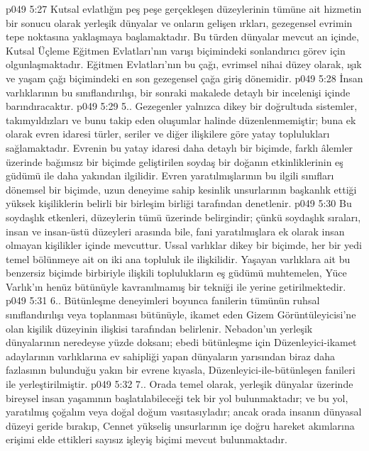 \vs p049 5:27 Kutsal evlatlığın peş peşe gerçekleşen düzeylerinin tümüne ait hizmetin bir sonucu olarak yerleşik dünyalar ve onların gelişen ırkları, gezegensel evrimin tepe noktasına yaklaşmaya başlamaktadır. Bu türden dünyalar mevcut an içinde, Kutsal Üçleme Eğitmen Evlatları’nın varışı biçimindeki sonlandırıcı görev için olgunlaşmaktadır. Eğitmen Evlatları’nın bu çağı, evrimsel nihai düzey olarak, ışık ve yaşam çağı biçimindeki en son gezegensel çağa giriş dönemidir.
\vs p049 5:28 İnsan varlıklarının bu sınıflandırılışı, bir sonraki makalede detaylı bir incelenişi içinde barındıracaktır.
\vs p049 5:29 5.\bibnobreakspace {}. Gezegenler yalnızca dikey bir doğrultuda sistemler, takımyıldızları ve bunu takip eden oluşumlar halinde düzenlenmemiştir; buna ek olarak evren idaresi türler, seriler ve diğer ilişkilere göre yatay toplulukları sağlamaktadır. Evrenin bu yatay idaresi daha detaylı bir biçimde, farklı âlemler üzerinde bağımsız bir biçimde geliştirilen soydaş bir doğanın etkinliklerinin eş güdümü ile daha yakından ilgilidir. Evren yaratılmışlarının bu ilgili sınıfları dönemsel bir biçimde, uzun deneyime sahip kesinlik unsurlarının başkanlık ettiği yüksek kişiliklerin belirli bir birleşim birliği tarafından denetlenir.
\vs p049 5:30 Bu soydaşlık etkenleri, düzeylerin tümü üzerinde belirgindir; çünkü soydaşlık sıraları, insan ve insan\hyp{}üstü düzeyleri arasında bile, fani yaratılmışlara ek olarak insan olmayan kişilikler içinde mevcuttur. Ussal varlıklar dikey bir biçimde, her bir yedi temel bölünmeye ait on iki ana topluluk ile ilişkilidir. Yaşayan varlıklara ait bu benzersiz biçimde birbiriyle ilişkili toplulukların eş güdümü muhtemelen, Yüce Varlık’ın henüz bütünüyle kavranılmamış bir tekniği ile yerine getirilmektedir.
\vs p049 5:31 6.\bibnobreakspace {}. Bütünleşme deneyimleri boyunca fanilerin tümünün ruhsal sınıflandırılışı veya toplanması bütünüyle, ikamet eden Gizem Görüntüleyicisi’ne olan kişilik düzeyinin ilişkisi tarafından belirlenir. Nebadon’un yerleşik dünyalarının neredeyse yüzde doksanı; ebedi bütünleşme için Düzenleyici\hyp{}ikamet adaylarının varlıklarına ev sahipliği yapan dünyaların yarısından biraz daha fazlasının bulunduğu yakın bir evrene kıyasla, Düzenleyici\hyp{}ile\hyp{}bütünleşen fanileri ile yerleştirilmiştir.
\vs p049 5:32 7.\bibnobreakspace {}. Orada temel olarak, yerleşik dünyalar üzerinde bireysel insan yaşamının başlatılabileceği tek bir yol bulunmaktadır; ve bu yol, yaratılmış çoğalım veya doğal doğum vasıtasıyladır; ancak orada insanın dünyasal düzeyi geride bırakıp, Cennet yükseliş unsurlarının içe doğru hareket akımlarına erişimi elde ettikleri sayısız işleyiş biçimi mevcut bulunmaktadır.
